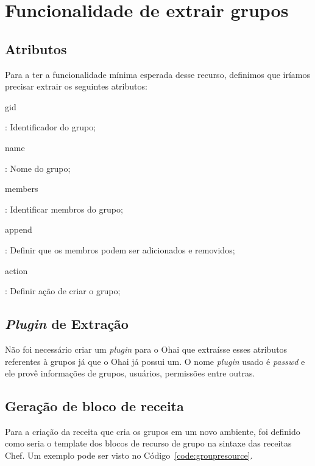 \section{Funcionalidade de extrair grupos}
\label{sec:groups}

\subsection{Atributos}

Para a ter a funcionalidade mínima esperada desse recurso, definimos que iríamos precisar
extrair os seguintes atributos:

\begin{itemize}
    {\itshape\item gid}: Identificador do grupo;
    {\itshape\item name}: Nome do grupo;
    {\itshape\item members}: Identificar membros do grupo;
\end{itemize}


\begin{itemize}
    {\itshape\item append}: Definir que os membros podem ser adicionados e removidos;
    {\itshape\item action}: Definir ação de criar o grupo;
\end{itemize}

\subsection{\textit{Plugin} de Extração}
Não foi necessário criar um \textit{plugin} para o Ohai que extraísse esses atributos
referentes à grupos já que o Ohai já possui um. O nome \textit{plugin} usado é 
\textit{passwd} e ele provê informações de grupos, usuários, permissões entre outras.

\subsection{Geração de bloco de receita}

Para a criação da receita que cria os grupos em um novo ambiente, foi definido
como seria o template dos blocos de recurso de grupo na sintaxe das receitas Chef.
Um exemplo pode ser visto no Código~\ref{code:groupresource}.

\noindent\begin{minipage}{\textwidth}
  \lstset{style=shell}
  
\end{minipage}\hfill

